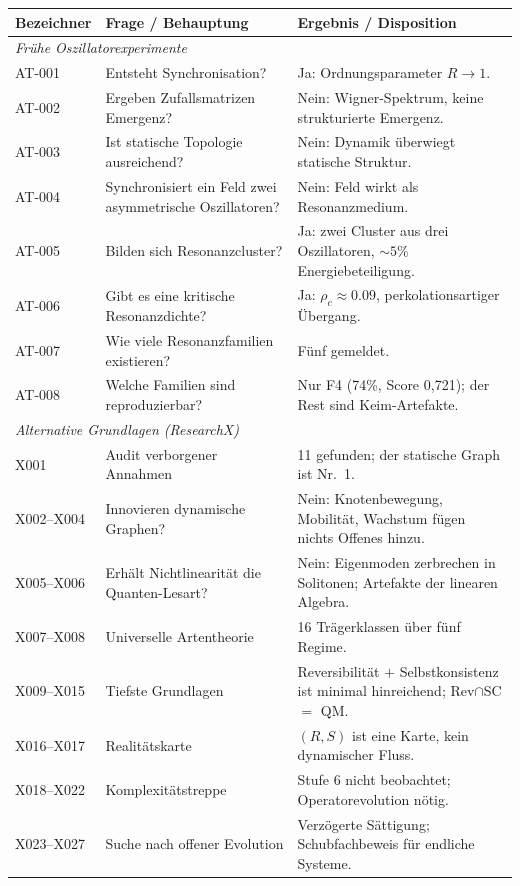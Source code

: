 \documentclass[10pt,twoside,openany]{book}
\begin{document}
\begin{longtable}{p{4.2cm}p{5.2cm}p{5.6cm}}
\toprule
Bezeichner & Frage / Behauptung & Ergebnis / Disposition \\
\midrule
\endhead
\multicolumn{3}{l}{\emph{Frühe Oszillatorexperimente}} \\
\midrule
AT-001 & Entsteht Synchronisation? & Ja: Ordnungsparameter $R\to1$. \\
AT-002 & Ergeben Zufallsmatrizen Emergenz? & Nein: Wigner-Spektrum, keine strukturierte Emergenz. \\
AT-003 & Ist statische Topologie ausreichend? & Nein: Dynamik überwiegt statische Struktur. \\
AT-004 & Synchronisiert ein Feld zwei asymmetrische Oszillatoren? & Nein: Feld wirkt als Resonanzmedium. \\
AT-005 & Bilden sich Resonanzcluster? & Ja: zwei Cluster aus drei Oszillatoren, $\sim5\%$ Energiebeteiligung. \\
AT-006 & Gibt es eine kritische Resonanzdichte? & Ja: $\rho_c\approx0.09$, perkolationsartiger Übergang. \\
AT-007 & Wie viele Resonanzfamilien existieren? & Fünf gemeldet. \\
AT-008 & Welche Familien sind reproduzierbar? & Nur F4 (74\%, Score 0,721); der Rest sind Keim-Artefakte. \\
\midrule
\multicolumn{3}{l}{\emph{Alternative Grundlagen (ResearchX)}} \\
\midrule
X001 & Audit verborgener Annahmen & 11 gefunden; der statische Graph ist Nr.~1. \\
X002--X004 & Innovieren dynamische Graphen? & Nein: Knotenbewegung, Mobilität, Wachstum fügen nichts Offenes hinzu. \\
X005--X006 & Erhält Nichtlinearität die Quanten-Lesart? & Nein: Eigenmoden zerbrechen in Solitonen; Artefakte der linearen Algebra. \\
X007--X008 & Universelle Artentheorie & 16 Trägerklassen über fünf Regime. \\
X009--X015 & Tiefste Grundlagen & Reversibilität $+$ Selbstkonsistenz ist minimal hinreichend; Rev$\cap$SC $=$ QM. \\
X016--X017 & Realitätskarte & $(R,S)$ ist eine Karte, kein dynamischer Fluss. \\
X018--X022 & Komplexitätstreppe & Stufe 6 nicht beobachtet; Operatorevolution nötig. \\
X023--X027 & Suche nach offener Evolution & Verzögerte Sättigung; Schubfachbeweis für endliche Systeme. \\

\end{longtable}
\end{document}
